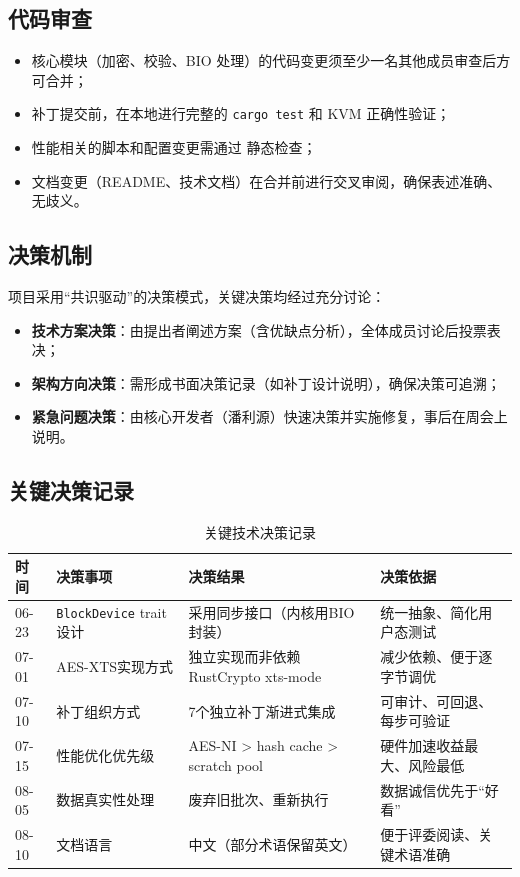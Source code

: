 \subsection{代码审查}

\begin{itemize}
    \item 核心模块（加密、校验、BIO 处理）的代码变更须至少一名其他成员审查后方可合并；
    \item 补丁提交前，在本地进行完整的 \texttt{cargo test} 和 KVM 正确性验证；
    \item 性能相关的脚本和配置变更需通过 \texttt{} 静态检查；
    \item 文档变更（README、技术文档）在合并前进行交叉审阅，确保表述准确、无歧义。
\end{itemize}

\subsection{决策机制}

项目采用“共识驱动”的决策模式，关键决策均经过充分讨论：

\begin{itemize}
    \item \textbf{技术方案决策}：由提出者阐述方案（含优缺点分析），全体成员讨论后投票表决；
    \item \textbf{架构方向决策}：需形成书面决策记录（如补丁设计说明），确保决策可追溯；
    \item \textbf{紧急问题决策}：由核心开发者（潘利源）快速决策并实施修复，事后在周会上说明。
\end{itemize}

\subsection{关键决策记录}

\begin{table}[H]
    \centering
    \small
    \caption{关键技术决策记录}
    \begin{tabular}{p{}p{}p{}p{}}
        \toprule
        \textbf{时间} & \textbf{决策事项} & \textbf{决策结果} & \textbf{决策依据} \\
        \midrule
        06-23 & \texttt{BlockDevice} trait 设计 & 采用同步接口（内核用BIO封装） & 统一抽象、简化用户态测试 \\
        07-01 & AES-XTS实现方式 & 独立实现而非依赖RustCrypto xts-mode & 减少依赖、便于逐字节调优 \\
        07-10 & 补丁组织方式 & 7个独立补丁渐进式集成 & 可审计、可回退、每步可验证 \\
        07-15 & 性能优化优先级 & AES-NI > hash cache > scratch pool & 硬件加速收益最大、风险最低 \\
        08-05 & 数据真实性处理 & 废弃旧批次、重新执行 & 数据诚信优先于“好看” \\
        08-10 & 文档语言 & 中文（部分术语保留英文） & 便于评委阅读、关键术语准确 \\
        \bottomrule
    \end{tabular}
\end{table}

